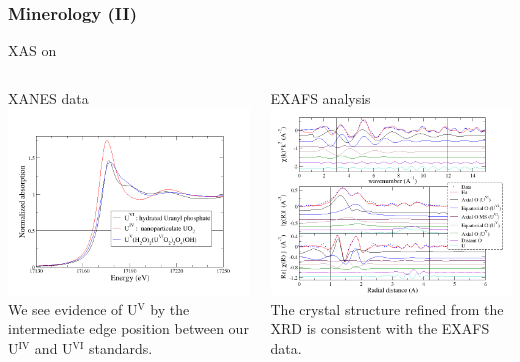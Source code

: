 \begin{frame}
  \frametitle{Minerology (II)}
  XAS on \ufivemineral

  \begin{columns}[T]
    \begin{column}{0.5\linewidth}
      \begin{center}
        \small
        XANES data\\
        \includegraphics[width=\linewidth]{xas/u5norm.png}\\
        We see evidence of U$^{\mathrm{V}}$ by  the intermediate edge position
        between our U$^{\mathrm{IV}}$ and U$^{\mathrm{VI}}$ standards.
      \end{center}
    \end{column}
    \begin{column}{0.5\linewidth}
      \begin{center}
        \small
        EXAFS analysis\\
        \includegraphics[width=\linewidth]{xas/u5chikr.png}\\
        The crystal structure refined from the XRD is consistent with
        the EXAFS data.
      \end{center}
    \end{column}
  \end{columns}


\end{frame}
